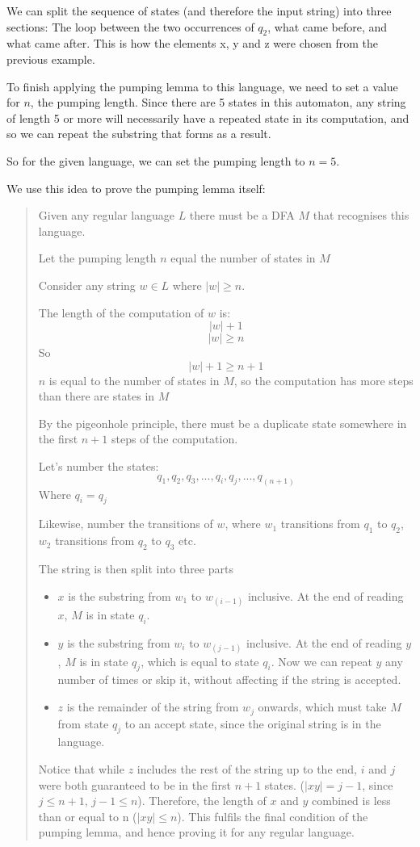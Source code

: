 \documentclass[11pt]{article}
\begin{document}
We can split the sequence of states (and therefore the input string) into three
sections: The loop between the two occurrences of $q_2$, what came before, and
what came after. This is how the elements x, y and z were chosen from the
previous example.

To finish applying the pumping lemma to this language, we need to set a value
for $n$, the pumping length. Since there are 5 states in this automaton, any
string of length 5 or more will necessarily have a repeated state in its
computation, and so we can repeat the substring that forms as a result.

So for the given language, we can set the pumping length to $n=5$.

We use this idea to prove the pumping lemma itself:
\begin{quote}
	Given any regular language $L$ there must be a DFA $M$ that recognises this
	language.

	Let the pumping length $n$ equal the number of states in $M$

	Consider any string $w \in L$ where $|w| \geq n$.

	The length of the computation of $w$ is: 
	$$|w| + 1$$
	$$|w| \geq n$$
	So
	$$|w| + 1 \geq n + 1$$
	$n$ is equal to the number of states in $M$, so the computation has more steps
	than there are states in $M$

	By the pigeonhole principle, there must be a duplicate state somewhere in the
	first $n+1$ steps of the computation.

	Let's number the states:
	$$q_1, q_2, q_3, ..., q_i, q_j, ..., q_{(n+1)}$$
	Where $q_i = q_j$
	
	Likewise, number the transitions of $w$, where $w_1$ transitions from $q_1$ to
	$q_2$, $w_2$ transitions from $q_2$ to $q_3$ etc.

	The string is then split into three parts
	\begin{itemize}
		\item[] $x$ is the substring from $w_1$ to $w_{(i-1)}$ inclusive. At the
			end of reading $x$, $M$ is in state $q_i$.
		\item[] $y$ is the substring from $w_i$ to $w_{(j-1)}$ inclusive. At the end
			of reading $y$, $M$ is in state $q_j$, which is equal to state $q_i$. Now
			we can repeat $y$ any number of times or skip it, without affecting if the
			string is accepted.
		\item[] $z$ is the remainder of the string from $w_j$ onwards, which must
			take $M$ from state $q_j$ to an accept state, since the original string is
			in the language.
	\end{itemize}

	Notice that while $z$ includes the rest of the string up to the end, $i$ and
	$j$ were both guaranteed to be in the first $n + 1$ states. ($|xy|=j-1$, since
	$j \leq n+1$, $j-1\leq n$). Therefore, the length of $x$ and $y$ combined is
	less than or equal to n ($|xy|\leq n$). This fulfils the final condition of
	the pumping lemma, and hence proving it for any regular language.
\end{quote}
\end{document}
